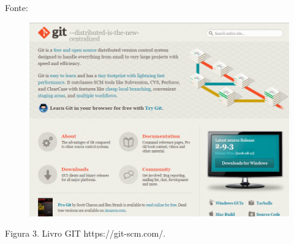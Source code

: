 \documentclass[t]{beamer}
\begin{document}
	
\begin{frame} {Fonte:}
		

\begin{figure}[tb!]
	\centering
	\includegraphics[scale=0.3,keepaspectratio=true]{site.png}
\end{figure}
Figura 3. Livro GIT https://git-scm.com/.	
\end{frame}			
\end{document}
